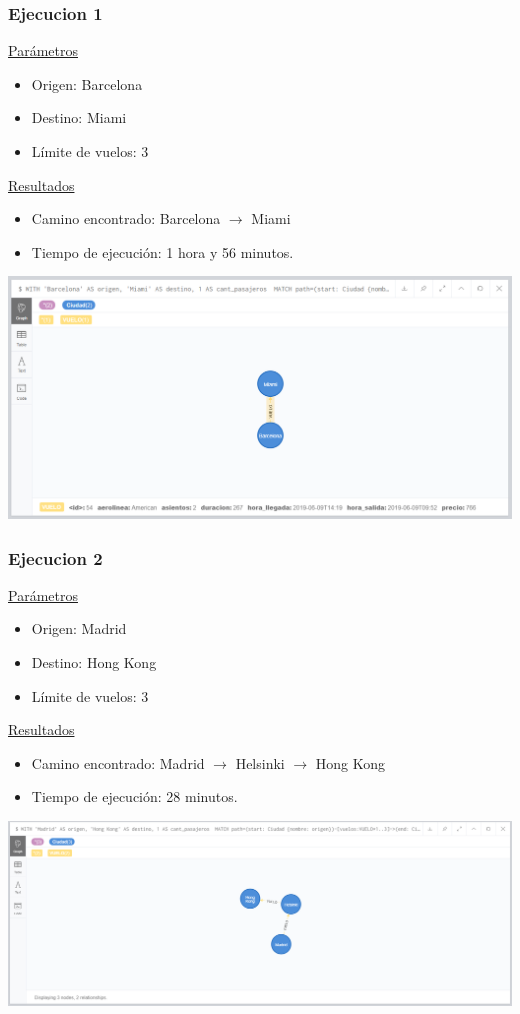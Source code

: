 \documentclass[a4paper,11pt]{article}
\begin{document}
\subsubsection*{Ejecucion 1}
\noindent
\underline{Parámetros}
\begin{itemize}
\item Origen: Barcelona
\item Destino: Miami
\item Límite de vuelos: 3
\end{itemize}
\underline{Resultados}
\begin{itemize}
\item Camino encontrado: Barcelona $\rightarrow$ Miami
\item Tiempo de ejecución: 1 hora y 56 minutos.
\end{itemize}
\begin{center}
\includegraphics[scale=0.40]{./imagenes/consultaA.png}
\end{center}
\newpage
\subsubsection*{Ejecucion 2}
\noindent
\underline{Parámetros}
\begin{itemize}
\item Origen: Madrid
\item Destino: Hong Kong
\item Límite de vuelos: 3
\end{itemize}
\underline{Resultados}
\begin{itemize}
\item Camino encontrado: Madrid $\rightarrow$ Helsinki $\rightarrow$ Hong Kong
\item Tiempo de ejecución: 28 minutos.
\end{itemize}
\begin{center}
\includegraphics[scale=0.40]{./imagenes/consultaA-ejec2.png}
\end{center}
\newpage
\end{document}
